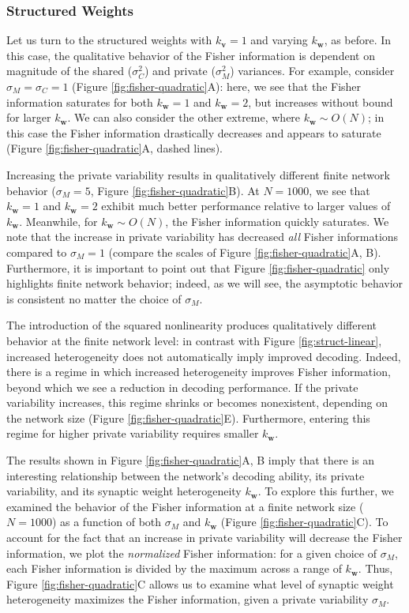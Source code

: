 \documentclass[11pt]{article}
\begin{document}
	\subsubsection{Structured Weights}
	Let us turn to the structured weights with $k_{\mathbf{v}}=1$ and varying $k_{\mathbf{w}}$, as before. In this case, the qualitative behavior of the Fisher information is dependent on magnitude of the shared ($\sigma_C^2$) and private ($\sigma_M^2$) variances. For example, consider $\sigma_M = \sigma_C=1$ (Figure \ref{fig:fisher-quadratic}A): here, we see that the Fisher information saturates for both $k_{\mathbf{w}}=1$ and $k_{\mathbf{w}}=2$, but increases without bound for larger $k_{\mathbf{w}}$. We can also consider the other extreme, where $k_{\mathbf{w}}\sim O(N)$; in this case the Fisher information drastically decreases and  appears to saturate (Figure \ref{fig:fisher-quadratic}A, dashed lines).
	
	Increasing the private variability results in qualitatively different finite network behavior ($\sigma_M=5$, Figure \ref{fig:fisher-quadratic}B). At $N=1000$, we see that $k_{\mathbf{w}}=1$ and $k_{\mathbf{w}}=2$ exhibit much better performance relative to larger values of $k_{\mathbf{w}}$. Meanwhile, for $k_{\mathbf{w}} \sim O(N)$, the Fisher information quickly saturates. We note that the increase in private variability has decreased \textit{all} Fisher informations compared to $\sigma_M=1$ (compare the scales of Figure \ref{fig:fisher-quadratic}A, B). Furthermore, it is important to point out that Figure \ref{fig:fisher-quadratic} only highlights finite network behavior; indeed, as we will see, the asymptotic behavior is consistent no matter the choice of $\sigma_M$.
	
	The introduction of the squared nonlinearity produces qualitatively different behavior at the finite network level: in contrast with Figure \ref{fig:struct-linear}, increased heterogeneity does not automatically imply improved decoding. Indeed, there is a regime in which increased heterogeneity improves Fisher information, beyond which we see a reduction in decoding performance. If the private variability increases, this regime shrinks or becomes nonexistent, depending on the network size (Figure \ref{fig:fisher-quadratic}E). Furthermore, entering this regime for higher private variability requires smaller $k_{\mathbf{w}}$. 
	
	The results shown in Figure \ref{fig:fisher-quadratic}A, B imply that there is an interesting relationship between the network's decoding ability, its private variability, and its synaptic weight heterogeneity $k_{\mathbf{w}}$. To explore this further, we examined the behavior of the Fisher information at a finite network size ($N=1000$) as a function of both $\sigma_M$ and $k_{\mathbf{w}}$ (Figure \ref{fig:fisher-quadratic}C).  To account for the fact that an increase in private variability will decrease the Fisher information, we plot the \textit{normalized} Fisher information: for a given choice of $\sigma_M$, each Fisher information is divided by the maximum across a range of $k_{\mathbf{w}}$. Thus, Figure \ref{fig:fisher-quadratic}C allows us to examine what level of synaptic weight heterogeneity maximizes the Fisher information, given a private variability $\sigma_M$.
	
\end{document}
